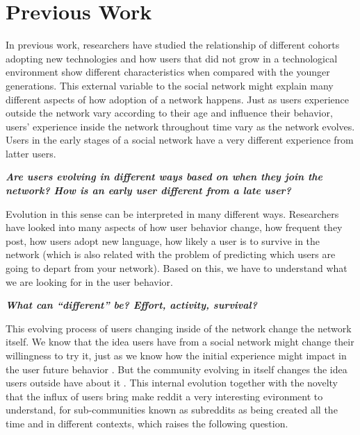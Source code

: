 \section{Previous Work}

In previous work, researchers have studied the relationship of different cohorts adopting new technologies and how users that did not grow in a technological environment show different characteristics when compared with the younger generations. This external variable to the social network might explain many different aspects of how adoption of a network happens. Just as users experience outside the network vary according to their age and influence their behavior, users' experience inside the network throughout time vary as the network evolves. Users in the early stages of a social network have a very different experience from latter users.

\textbf{\textit{Are users evolving in different ways based on when they join the network? How is an early user different from a late user?}}

Evolution in this sense can be interpreted in many different ways. Researchers have looked into many aspects of how user behavior change, how frequent they post, how users adopt new language, how likely a user is to survive in the network (which is also related with the problem of predicting which users are going to depart from your network). Based on this, we have to understand what we are looking for in the user behavior.

\textbf{\textit{What can ``different'' be? Effort, activity, survival?}}

This evolving process of users changing inside of the network change the network itself. We know that the idea users have from a social network might change their willingness to try it, just as we know how the initial experience might impact in the user future behavior \cite{Miller2015}. But the community evolving in itself changes the idea users outside have about it \cite{Danescu-niculescu-mizil2013}. This internal evolution together with the novelty that the influx of users bring make reddit a very interesting evironment to understand, for sub-communities known as subreddits as being created all the time and in different contexts, which raises the following question.

